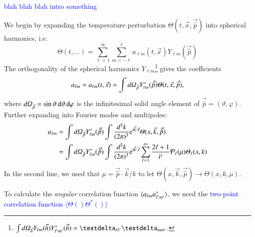 \textcolor{blue}{blah blah blah intro something}


We begin by expanding the temperature perturbation $\Theta(t, \vec{x}, \vec{\hat{p}})$ into spherical harmonics, i.e.
\begin{equation}
    \Theta(t, \dots) = \sum_{\ell=1}^{\infty} \sum_{m=-\ell}^{\ell} a_{\ell m}(t, \vec{x}) Y_{\ell m} (\vec{\hat{p}})
\end{equation}
The orthogonality of the spherical harmonics $Y_{\ell m}$\footnote{$\int \dOmg[n] Y\ellm(\vec{\hat{n}}) Y\ellmp^*(\vec{\hat{n}}) = \deltasym{\ell \ell'} \deltasym{m m'} $.} gives the coefficients
\begin{equation}
    a\ellm = a\ellm(t,\vec{x}) = \int \dOmg[p] Y^*_{\ell m} (\vec{\hat{p}}) \Theta(t, \vec{x}, \vec{\hat{p}}),
\end{equation}
where $d\varOmega_{\vec{\hat{p}}} = \sin{\vartheta} \diff \vartheta\diff \varphi$ is the infinitesimal solid angle element of $\vec{\hat{p}} = (\vartheta, \varphi)$. Further expanding into Fourier modes and multipoles:
\begin{equation}
\begin{split}
    a_{\ell m} &= \int \dOmg[p] Y^*_{\ell m} (\vec{\hat{p}}) \int \frac{d^3 k}{(2\pi)^3} \eu[\im \vec{k}\cdot \vec{x}] \Theta(x, \vec{k}, \vec{\hat{p}})  \\
    &= \int \dOmg[p] Y^*_{\ell m} (\vec{\hat{p}}) \int \frac{d^3 k}{(2\pi)^3} \eu[\im \vec{k}\cdot \vec{x}]\sum_{{\ell=1}}^{\infty} \frac{2\ell + 1}{\im^\ell} \mathcal{P}_\ell(\mu) \Theta_\ell(x, k)
\end{split}
\end{equation}
In the second line, we used that $\mu=\vec{\hat{p}}\cdot\vec{k}/k$ to let $\Theta(x,\vec{k}, \vec{\hat{p}}) \to\Theta(x,k,\mu) $.


To calculate the \textit{angular} correlation function $\langle a\ellm a^*\ellmp \rangle$, we need the \textcolor{blue}{two-point correlation function $\langle \Theta() \Theta^*()\rangle$} 





